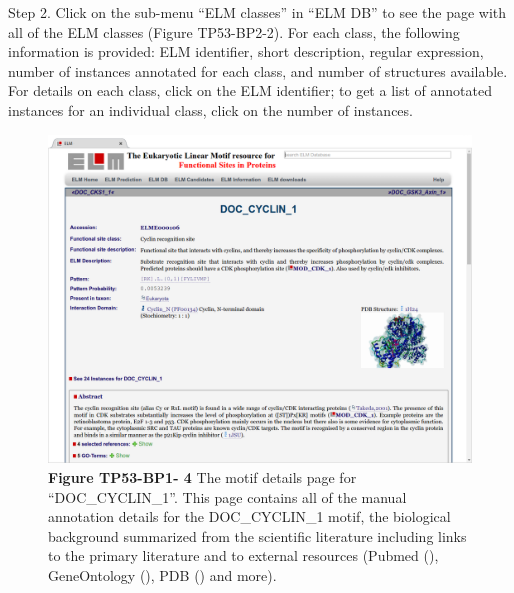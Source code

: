 Step 2. Click on the sub-menu ``ELM classes'' in ``ELM DB'' to see the
page with all of the ELM classes (Figure TP53-BP2-2). For each class,
the following information is provided: ELM identifier, short
description, regular expression, number of instances annotated for each
class, and number of structures available. For details on each class,
click on the ELM identifier; to get a list of annotated instances for an
individual class, click on the number of instances.


\begin{figure}[h!]
\centering
\includegraphics[width=\textwidth]{Figures/TP53_1/doc_cyclin_1_class.png}
\caption{
\textbf{Figure TP53-BP1- 4} 
The motif details page for
``DOC\_CYCLIN\_1''. This page contains all of the manual annotation
details for the DOC\_CYCLIN\_1 motif, the biological background
summarized from the scientific literature including links to the primary
literature and to external resources (Pubmed (\cite{27899561}),
GeneOntology (\cite{27899567}), PDB (\cite{12037327}) and more).
}
\end{figure}

